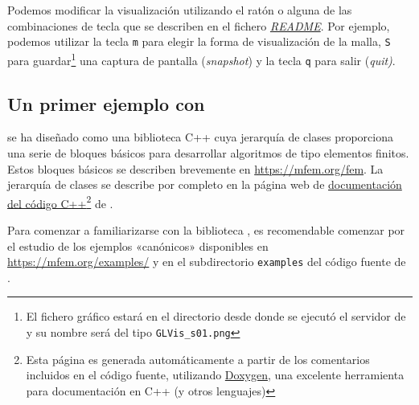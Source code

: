 Podemos modificar la visualización utilizando el ratón o alguna de las
combinaciones de tecla que se describen en el fichero
\href{https://raw.githubusercontent.com/glvis/glvis/master/README}{\textit{README}}. Por
ejemplo, podemos utilizar la tecla \texttt{m} para elegir la forma de
visualización de la malla, \texttt{S} para guardar\footnote{El fichero
  gráfico estará en el directorio desde donde se ejecutó el servidor
  de \glvis y su nombre será del tipo \texttt{GLVis\_s01.png}} una
captura de pantalla (\textit{snapshot}) y la tecla \texttt{q} para
salir (\textit{quit)}.


\subsection{Un primer ejemplo con \mfem}

\mfem se ha diseñado como una biblioteca C++ cuya jerarquía de clases
proporciona una serie de bloques básicos para desarrollar algoritmos
de tipo elementos finitos. Estos bloques básicos se describen
brevemente en \url{https://mfem.org/fem}. La jerarquía de clases se
describe por completo en la página web de
\href{https://mfem.github.io/doxygen/html/index.html}{documentación
  del código C++}\footnote{Esta página es generada automáticamente a
  partir de los comentarios incluidos en el código fuente, utilizando
  \href{https://www.doxygen.nl/index.html}{Doxygen}, una excelente
  herramienta para documentación en C++ (y otros lenguajes)} de \mfem.

Para comenzar a familiarizarse con la biblioteca \mfem, es
recomendable comenzar por el estudio de los ejemplos «canónicos»
disponibles en \url{https://mfem.org/examples/} y en el subdirectorio
\texttt{examples} del código fuente de \mfem.

